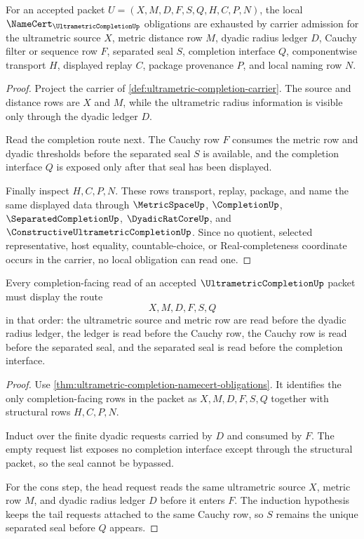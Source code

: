 \begin{theorem}
\label{thm:ultrametric-completion-namecert-obligations}
For an accepted packet $U=(X,M,D,F,S,Q,H,C,P,N)$, the local $\NameCert_{\UltrametricCompletionUp}$ obligations are exhausted by carrier admission for the ultrametric source $X$, metric distance row $M$, dyadic radius ledger $D$, Cauchy filter or sequence row $F$, separated seal $S$, completion interface $Q$, componentwise transport $H$, displayed replay $C$, package provenance $P$, and local naming row $N$.
\end{theorem}
\begin{proof}
Project the carrier of \autoref{def:ultrametric-completion-carrier}. The source and distance rows are $X$ and $M$, while the ultrametric radius information is visible only through the dyadic ledger $D$.

Read the completion route next. The Cauchy row $F$ consumes the metric row and dyadic thresholds before the separated seal $S$ is available, and the completion interface $Q$ is exposed only after that seal has been displayed.

Finally inspect $H,C,P,N$. These rows transport, replay, package, and name the same displayed data through $\MetricSpaceUp$, $\CompletionUp$, $\SeparatedCompletionUp$, $\DyadicRatCoreUp$, and $\ConstructiveUltrametricCompletionUp$. Since no quotient, selected representative, host equality, countable-choice, or Real-completeness coordinate occurs in the carrier, no local obligation can read one.
\end{proof}

\begin{theorem}
\label{thm:ultrametric-completion-cauchy-seal-handoff}
Every completion-facing read of an accepted $\UltrametricCompletionUp$ packet must display the route
$$
X,M,D,F,S,Q
$$
in that order: the ultrametric source and metric row are read before the dyadic radius ledger, the ledger is read before the Cauchy row, the Cauchy row is read before the separated seal, and the separated seal is read before the completion interface.
\end{theorem}
\begin{proof}
Use \autoref{thm:ultrametric-completion-namecert-obligations}. It identifies the only completion-facing rows in the packet as $X,M,D,F,S,Q$ together with structural rows $H,C,P,N$.

Induct over the finite dyadic requests carried by $D$ and consumed by $F$. The empty request list exposes no completion interface except through the structural packet, so the seal cannot be bypassed.

For the cons step, the head request reads the same ultrametric source $X$, metric row $M$, and dyadic radius ledger $D$ before it enters $F$. The induction hypothesis keeps the tail requests attached to the same Cauchy row, so $S$ remains the unique separated seal before $Q$ appears.
\end{proof}

